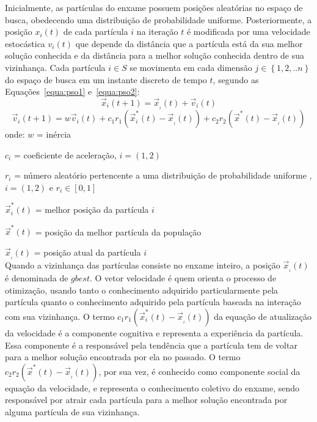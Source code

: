 \documentclass[sigconf]{acmart}
\begin{document}
Inicialmente, as partículas do enxame possuem posições aleatórias no espaço de busca, obedecendo uma distribuição de probabilidade uniforme. Posteriormente, a posição $ {x_i}\left( t \right) $ de cada partícula $ i $ na iteração $ t $ é modificada por uma velocidade estocástica $ {v_i}\left( t \right) $ que depende da distância que a partícula está da sua melhor solução conhecida e da distância para a melhor solução conhecida dentro de sua vizinhança. Cada partícula $i \in S$ se movimenta em cada dimensão $j \in \left\{ {1,2,..n} \right\}$ do espaço de busca em um instante discreto de tempo $ t $, segundo as Equações~\ref{equa:pso1} e~\ref{equa:pso2}:
\begin{equation}
{\overrightarrow x _i}\left( {t + 1} \right) = {\overrightarrow x _{_i}}\left( t \right) + {\overrightarrow v _i}\left( t \right)
\label{equa:pso1}
\end{equation}
%
\begin{equation}
{\overrightarrow v _i}\left( {t + 1} \right) = w{\overrightarrow v _i}\left( t \right) + {c_1}{r_1}\left( {\overrightarrow x _i^*\left( t \right) - {{\overrightarrow x }_{_i}}\left( t \right)} \right) + {c_2}{r_2}\left( {{{\overrightarrow x }^*}\left( t \right) - {{\overrightarrow x }_{_i}}\left( t \right)} \right)
\label{equa:pso2}
\end{equation}
onde:
$ w $ = inércia

$ c _i $ = coeficiente de aceleração, $i=\left( 1,2 \right)$

$ r _i $ = número aleatório pertencente a uma distribuição de probabilidade uniforme , $i=\left( 1,2 \right)$ e ${r_i} \in \left[ {0,1} \right]$

$  \overrightarrow x _i^*\left( t \right) $ = melhor posição da partícula $ i $

$ {\overrightarrow x }^*\left( t \right) $ = posição da melhor partícula da população

${\overrightarrow x _{_i}}\left( t \right)$ = posição atual da partícula $ i $\\
Quando a vizinhança das partículas consiste no enxame inteiro, a posição ${\overrightarrow x _{_i}}\left( t \right)$ é denominada de $ gbest $. O vetor velocidade é quem orienta o processo de otimização, usando tanto o conhecimento adquirido particularmente pela partícula quanto o conhecimento adquirido pela partícula baseada na interação com sua vizinhança. O termo $ {c_1}{r_1}\left( {\overrightarrow x _i^*\left( t \right) - {{\overrightarrow x }_{_i}}\left( t \right)} \right) $ da equação de atualização da velocidade é a componente cognitiva e representa a experiência da partícula. Essa componente é a responsável pela tendência que a partícula tem de voltar para a melhor solução encontrada por ela no passado. O termo $ {c_2}{r_2}\left( {{{\overrightarrow x }^*}\left( t \right) - {{\overrightarrow x }_{_i}}\left( t \right)} \right) $, por sua vez, é conhecido como componente social da equação da velocidade, e representa o conhecimento coletivo do enxame, sendo responsável por atrair cada partícula para a melhor solução encontrada por alguma partícula de sua vizinhança. 
% 	
\end{document}
